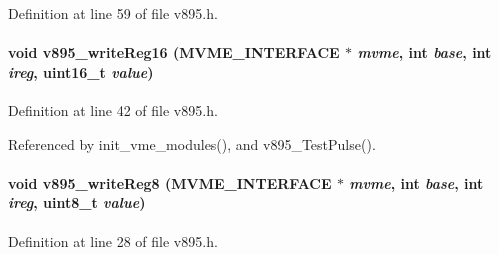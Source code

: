 Definition at line 59 of file v895.h.
\paragraph[{v895\_\-writeReg16}]{\setlength{\rightskip}{0pt plus 5cm}void v895\_\-writeReg16 ({\bf MVME\_\-INTERFACE} $\ast$ {\em mvme}, \/  int {\em base}, \/  int {\em ireg}, \/  uint16\_\-t {\em value})}\hfill\label{v895_8h_a9dbec3f487884bc4c677796e59341f36}


Definition at line 42 of file v895.h.

Referenced by init\_\-vme\_\-modules(), and v895\_\-TestPulse().
\paragraph[{v895\_\-writeReg8}]{\setlength{\rightskip}{0pt plus 5cm}void v895\_\-writeReg8 ({\bf MVME\_\-INTERFACE} $\ast$ {\em mvme}, \/  int {\em base}, \/  int {\em ireg}, \/  uint8\_\-t {\em value})}\hfill\label{v895_8h_a8341d3c5298e6b430a58da03760d3dd4}


Definition at line 28 of file v895.h.